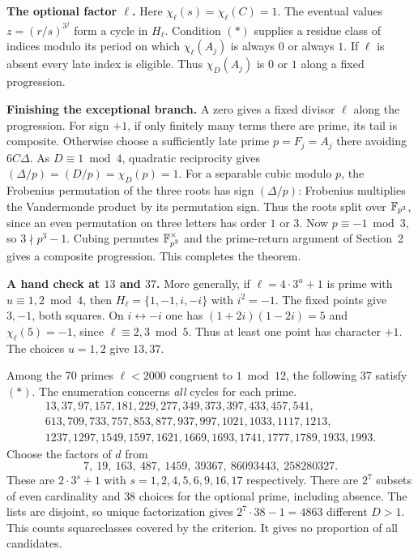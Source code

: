 \documentclass[11pt,a4paper,oneside,openany]{book}
\newcommand{\lead}[1]{\textbf{#1}\enspace}\let\para\lead
\begin{document}
\lead{The optional factor $\ell$.} Here $\chi_\ell(s)=\chi_\ell(C)=1$. The eventual values $z=(r/s)^{3^j}$ form a cycle in $H_\ell$. Condition $(*)$ supplies a residue class of indices modulo its period on which $\chi_\ell(A_j)$ is always $0$ or always $1$. If $\ell$ is absent every late index is eligible. Thus $\chi_D(A_j)$ is $0$ or $1$ along a fixed progression.

\lead{Finishing the exceptional branch.} A zero gives a fixed divisor $\ell$ along the progression. For sign $+1$, if only finitely many terms there are prime, its tail is composite. Otherwise choose a sufficiently late prime $p=F_j=A_j$ there avoiding $6C\Delta$. As $D\equiv1\bmod4$, quadratic reciprocity gives $(\Delta/p)=(D/p)=\chi_D(p)=1$. For a separable cubic modulo $p$, the Frobenius permutation of the three roots has sign $(\Delta/p)$: Frobenius multiplies the Vandermonde product by its permutation sign. Thus the roots split over $\mathbb F_{p^3}$, since an even permutation on three letters has order $1$ or $3$. Now $p\equiv-1\bmod3$, so $3\nmid p^3-1$. Cubing permutes $\mathbb F_{p^3}^\times$ and the prime-return argument of Section~2 gives a composite progression. This completes the theorem.

\lead{A hand check at $13$ and $37$.} More generally, if $\ell=4\cdot 3^u+1$ is prime with $u\equiv1,2\bmod4$, then $H_\ell=\{1,-1,i,-i\}$ with $i^2=-1$. The fixed points give $3,-1$, both squares. On $i\leftrightarrow-i$ one has $(1+2i)(1-2i)=5$ and $\chi_\ell(5)=-1$, since $\ell\equiv2,3\bmod5$. Thus at least one point has character $+1$. The choices $u=1,2$ give $13,37$.



Among the 70 primes $\ell<2000$ congruent to $1\bmod12$, the following 37 satisfy $(*)$. The enumeration concerns \emph{all} cycles for each prime.
\[
\begin{gathered}
13,37,97,157,181,229,277,349,373,397,433,457,541,\\
613,709,733,757,853,877,937,997,1021,1033,1117,1213,\\
1237,1297,1549,1597,1621,1669,1693,1741,1777,1789,1933,1993 .
\end{gathered}
\]
Choose the factors of $d$ from
\[
7,\ 19,\ 163,\ 487,\ 1459,\ 39367,\ 86093443,\ 258280327 .
\]
These are $2\cdot3^s+1$ with $s=1,2,4,5,6,9,16,17$ respectively. There are $2^7$ subsets of even cardinality and $38$ choices for the optional prime, including absence. The lists are disjoint, so unique factorization gives $2^7\cdot38-1=4863$ different $D>1$. This counts squareclasses covered by the criterion. It gives no proportion of all candidates.
\end{document}

